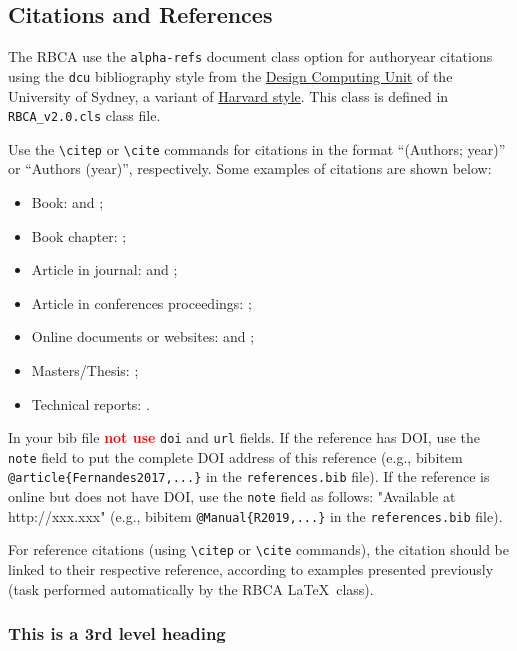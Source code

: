 \documentclass[alpha-refs,english]{RBCA_v3.0}
\begin{document}
\subsection{Citations and References}
The RBCA use the \verb|alpha-refs| document class option for authoryear citations using the \verb|dcu| bibliography style from the \href{https://www.dcu.ie/library/classes_and_tutorials/citing.shtml}{Design Computing Unit} of the University of Sydney, a variant of \href{https://www.ctan.org/pkg/harvard}{Harvard style}. This class is defined in \verb|RBCA_v2.0.cls| class file.

Use the \verb|\citep| or \verb|\cite| commands for citations in the format ``(Authors; year)'' or ``Authors (year)'', respectively.
Some examples of citations are shown below:
\begin{itemize}
	\item Book: \cite{Dongarra2003} and \citep{Wickham2017};
	\item Book chapter: \cite{Holbig2004};
	\item Article in journal: \citep{Fernandes2017} and \cite{Resenes2019};
	\item Article in conferences proceedings: \cite{Holbig2014};
	\item Online documents or websites: \citep{Shiny2019} and \cite{R2019};
	\item Masters/Thesis: \cite{Nicolau2018};
	\item Technical reports: \citep{Holbig2003}.
\end{itemize}

In your bib file \textcolor{red}{\textbf{not use}} \verb|doi| and \verb|url| fields. If the reference has DOI, use the \verb|note| field to put the complete DOI address of this reference (e.g.,  bibitem \verb|@article{Fernandes2017,...}| in the \verb|references.bib| file). If the reference is online but does not have DOI, use the \verb|note| field as follows: "Available at http://xxx.xxx" (e.g., bibitem \verb|@Manual{R2019,...}| in the \verb|references.bib| file).

For reference citations (using \verb|\citep| or \verb|\cite| commands), the citation should be linked to their respective reference, according to examples presented previously (task performed automatically by the RBCA \LaTeX\ class).

\subsubsection{This is a 3rd level heading}
\end{document}
